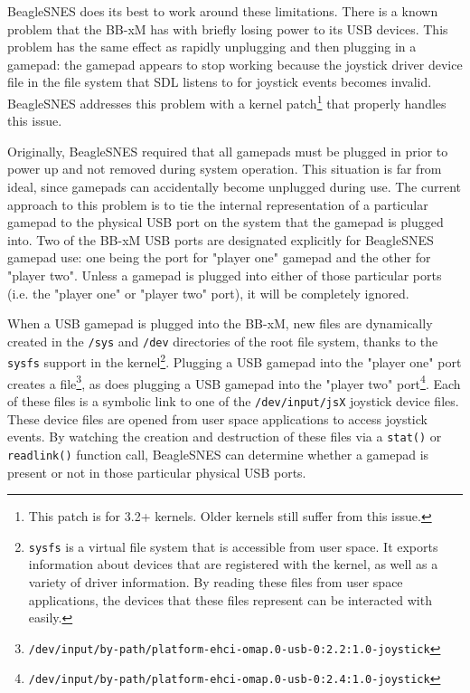BeagleSNES does its best to work around these limitations.  There is a known problem that the BB-xM has with briefly losing power to its USB devices.  This problem has the same effect as rapidly unplugging and then plugging in a gamepad: the gamepad appears to stop working because the joystick driver device file in the file system that SDL listens to for joystick events becomes invalid.   BeagleSNES addresses this problem with a kernel patch\footnote{This patch is for 3.2+ kernels.  Older kernels still suffer from this issue.} that properly handles this issue. 

Originally, BeagleSNES required that all gamepads must be plugged in prior to power up and not removed during system operation.  This situation is far from ideal, since gamepads can accidentally become unplugged during use.  The current approach to this problem is to tie the internal representation of a particular gamepad to the physical USB port on the system that the gamepad is plugged into.  Two of the BB-xM USB ports are designated explicitly for BeagleSNES gamepad use: one being the port for "player one" gamepad and the other for "player two".  Unless a gamepad is plugged into either of those particular ports (i.e. the "player one" or "player two" port), it will be completely ignored.  

When a USB gamepad is plugged into the BB-xM, new files are dynamically created in the \texttt{/sys} and \texttt{/dev} directories of the root file system, thanks to the \texttt{sysfs} support in the kernel\footnote{\texttt{sysfs} is a virtual file system that is accessible from user space.  It exports information about devices that are registered with the kernel, as well as a variety of driver information.  By reading these files from user space applications, the devices that these files represent can be interacted with easily.}.  Plugging a USB gamepad into the "player one" port creates a file\footnote{\texttt{/dev/input/by-path/platform-ehci-omap.0-usb-0:2.2:1.0-joystick}}, as does plugging a USB gamepad into the "player two" port\footnote{\texttt{/dev/input/by-path/platform-ehci-omap.0-usb-0:2.4:1.0-joystick}}.  Each of these files is a symbolic link to one of the \texttt{/dev/input/jsX} joystick device files.  These device files are opened from user space applications to access joystick events. By watching the creation and destruction of these files via a \texttt{stat()} or \texttt{readlink()} function call, BeagleSNES can determine whether a gamepad is present or not in those particular physical USB ports.  

